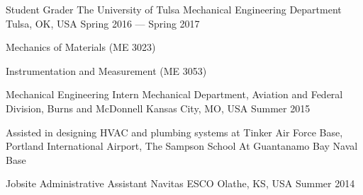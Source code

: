 

\begin{cventries}

  \cventry
    {Student Grader} %
    {The University of Tulsa Mechanical Engineering Department} %
    {Tulsa, OK, USA} %
    {Spring 2016 --- Spring 2017} %
    {
      \begin{cvitems} %
        \item{Mechanics of Materials (ME 3023)}
        \item{Instrumentation and Measurement (ME 3053)}
      \end{cvitems}
    }

\cventry
	{Mechanical Engineering Intern} %
	{Mechanical Department, Aviation and Federal Division, Burns and McDonnell} %
	{Kansas City, MO, USA} %
	{Summer 2015} %
	{
		\begin{cvitems} %
			\item{Assisted in designing HVAC and plumbing systems at Tinker Air Force Base, Portland International Airport, The Sampson School At Guantanamo Bay Naval Base}
		\end{cvitems}
	}

\cventry
	{Jobsite Administrative Assistant} %
	{Navitas ESCO} %
	{Olathe, KS, USA} %
	{Summer 2014} %
	{}

\end{cventries}